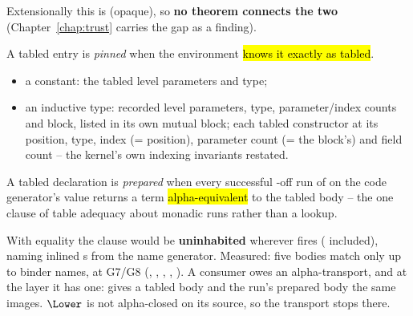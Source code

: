 \begin{remark}
 Extensionally this is  (opaque), so \textbf{no theorem connects the
two} (Chapter~\ref{chap:trust} carries the gap as a finding).
\end{remark}

\begin{definition}\label{def:Witness-ReifiedDecl-Pinned}
 \leanok
{}
 A tabled entry is \emph{pinned} when the environment \hl{knows it exactly as tabled}.
\begin{itemize}
\item a constant: the tabled level parameters and type;
\item an inductive type: recorded level parameters, type, parameter/index counts and block, listed in
its own mutual block; each tabled constructor at its position, type, index (= position), parameter
count (= the block's) and field count -- the kernel's own indexing invariants restated.
\end{itemize}
\end{definition}

\begin{definition}\label{def:Witness-ReifiedDecl-Prepared}
 \leanok
{}
 A tabled declaration is \emph{prepared} when every successful -off run of
 on the code generator's value returns a term \hl{alpha-equivalent} to
the tabled body -- the one clause of table adequacy about monadic runs rather than a lookup.
\end{definition}

\begin{remark}
 With equality the clause would be \textbf{uninhabited} wherever 
fires ( included), naming inlined s from the name generator. Measured: five
bodies match only up to binder names, at G7/G8 (, , ,
, ). A consumer owes an alpha-transport, and at the \Erases{} layer it
has one:  gives a tabled body and the run's prepared body
the same \lbox{} images. $\Lower$ is not alpha-closed on its source, so the transport stops there.
\end{remark}

